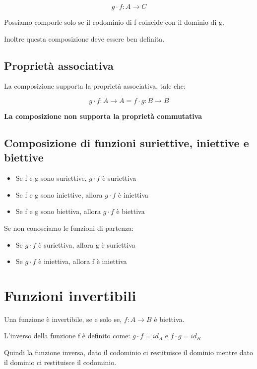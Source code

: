 \documentclass[a4paper, 10pt]{article}
\begin{document}
$$ g \cdot f: A \rightarrow C $$

Possiamo comporle solo se il codominio di f coincide con il dominio di g.

Inoltre questa composizione deve essere ben definita.

\subsection{Proprietà associativa}
La composizione supporta la proprietà associativa, tale che:

$$ g \cdot f: A \rightarrow A = f \cdot g: B \rightarrow B $$

\textbf{La composizione non supporta la proprietà commutativa}

\subsection{Composizione di funzioni suriettive, iniettive e biettive}

\begin{itemize}
	\item Se f e g sono suriettive, $ g \cdot f $ è suriettiva
	\item Se f e g sono iniettive, allora $ g \cdot f $ è iniettiva
	\item Se f e g sono biettiva, allora $ g \cdot f $ è biettiva
\end{itemize}
Se non conosciamo le funzioni di partenza:

\begin{itemize}
	\item Se $ g \cdot f $ è suriettiva, allora g è suriettiva
	\item Se $ g \cdot f $ è iniettiva, allora f è iniettiva
\end{itemize}

\section{Funzioni invertibili}
Una funzione è invertibile, se e solo se, $ f:A \rightarrow B $ è biettiva.

L'inverso della funzione f è definito come: $ g \cdot f = id_A $ e $ f \cdot g = id_B $

Quindi la funzione inversa, dato il codominio ci restituisce il dominio mentre dato il dominio ci restituisce il codominio.
\end{document}
